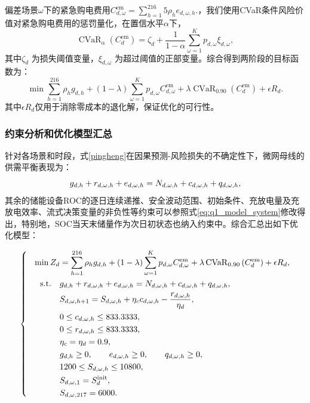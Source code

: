 \documentclass{cumcm2026}
\begin{document}
偏差场景$\omega$下的紧急购电费用$
C^{\mathrm{em}}_{d,\omega}
=\sum_{h=1}^{216}5\rho_h e_{d,\omega,h}.
$，我们使用CVaR条件风险价值\cite{rockafellar2000optimization}对紧急购电费用的惩罚量化，在置信水平$\alpha$下，
$$
\operatorname{CVaR}_{\alpha}(C^{\mathrm{em}}_{d})
=\zeta_d+\frac{1}{1-\alpha}
\sum_{\omega=1}^{K}p_{d,\omega}\xi_{d,\omega},
$$
其中$\zeta_d$ 为损失阈值变量，$\xi_{d,\omega}$ 为超过阈值的正部变量。综合得到两阶段的目标函数为：
\begin{equation}
\label{q2model}
\min \sum_{h=1}^{216}\rho_h g_{d,h}
+(1-\lambda)\sum_{\omega=1}^{K}p_{d,\omega}C^{\mathrm{em}}_{d,\omega}
+\lambda\operatorname{CVaR}_{0.90}(C^{\mathrm{em}}_{d})
+\epsilon R_d.
\end{equation}
其中$\epsilon R_d$仅用于消除零成本的退化解，保证优化的可行性。

\subsubsection{约束分析和优化模型汇总}
针对各场景和时段，式\ref{pingheng}在因果预测-风险损失的不确定性下，微网母线的供需平衡表现为：
\begin{equation}
g_{d,h}+r_{d,\omega,h}+e_{d,\omega,h}
  =N_{d,\omega,h}+c_{d,\omega,h}+q_{d,\omega,h},\\[2mm]
\end{equation}
其余的储能设备ROC的逐日连续递推、安全波动范围、初始条件、充放电量及充放电效率、流式决策变量的非负性等约束可以参照式\eqref{eq:q1_model_system}修改得出，特别地，SOC当天末储量作为次日初状态也纳入约束中。综合汇总出如下优化模型：

\begin{equation}
\left\{
\begin{aligned}
\min Z_d
&=
\sum_{h=1}^{216}\rho_h g_{d,h}
+
(1-\lambda)
\sum_{\omega=1}^{K}
p_{d,\omega}C^{\mathrm{em}}_{d,\omega}
+
\lambda\operatorname{CVaR}_{0.90}
\left(C^{\mathrm{em}}_{d}\right)
+
\epsilon R_d,\\
\quad\quad\mkern-8mu\mathrm{s.t.}\quad
&g_{d,h}+r_{d,\omega,h}+e_{d,\omega,h}
=
N_{d,\omega,h}+c_{d,\omega,h}+q_{d,\omega,h},\\
&S_{d,\omega,h+1}
=
S_{d,\omega,h}
+
\eta_c c_{d,\omega,h}
-
\frac{r_{d,\omega,h}}{\eta_d},\\
&0\le c_{d,\omega,h}\le833.3333,\\
&0\le r_{d,\omega,h}\le833.3333,\\
&\eta_c=\eta_d=0.9,\\
&g_{d,h}\ge0,\qquad
e_{d,\omega,h}\ge0,\qquad
q_{d,\omega,h}\ge0,\\
&1200\le S_{d,\omega,h}\le10800,\\
&S_{d,\omega,1}=S_d^{\mathrm{init}},\\
&S_{d,\omega,217}=6000.
\end{aligned}
\right.
\label{eq:q2_stochastic_model}
\end{equation}
\end{document}
